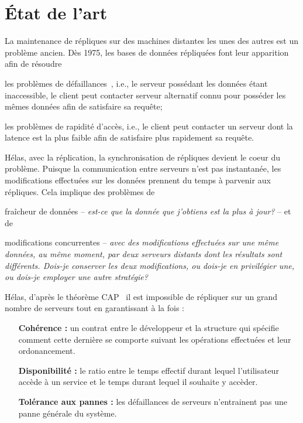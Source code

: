 
\section{État de l'art}
\label{repl:sec:replication}

La maintenance de répliques sur des machines distantes les unes des
autres est un problème ancien. Dès 1975, les bases de données répliquées font
leur apparition~\cite{johnson1975maintenance} afin de résoudre
\begin{inparaenum}[(i)]
\item les problèmes de défaillances~\cite{alsberg1976principle}, i.e., le
  serveur possédant les données étant inaccessible, le client peut contacter
  serveur alternatif connu pour posséder les mêmes données afin de satisfaire sa
  requête;
\item les problèmes de rapidité d'accès, i.e., le client peut contacter un
  serveur dont la latence est la plus faible afin de satisfaire plus rapidement
  sa requête.
\end{inparaenum}

Hélas, avec la réplication, la synchronisation de répliques devient le coeur du
problème. Puisque la communication entre serveurs n'est pas instantanée, les
modifications effectuées sur les données prennent du temps à parvenir aux
répliques. Cela implique des problèmes de
\begin{inparaenum}[(i)]
\item fraîcheur de données -- \emph{est-ce que la donnée que j'obtiens est la
    plus à jour?} -- et de
\item modifications concurrentes -- \emph{avec des modifications effectuées sur
    une même données, au même moment, par deux serveurs distants dont les
    résultats sont différents. Dois-je conserver les deux modifications, ou
    dois-je en privilégier une, ou dois-je employer une autre stratégie?}
\end{inparaenum}


Hélas, d'après le théorème CAP~\cite{gilbert2002brewer} il est impossible de
répliquer sur un grand nombre de serveurs tout en garantissant à la fois :
\begin{itemize}
\item [\textbf{Cohérence :}] un contrat entre le développeur et la structure qui
  spécifie comment cette dernière se comporte suivant les opérations effectuées
  et leur ordonancement.
\item [\textbf{Disponibilité :}] le ratio entre le temps effectif durant lequel
  l'utilisateur accède à un service et le temps durant lequel il souhaite y
  accèder.
\item [\textbf{Tolérance aux pannes :}] les défaillances de serveurs
  n'entrainent pas une panne générale du système.
\end{itemize}

